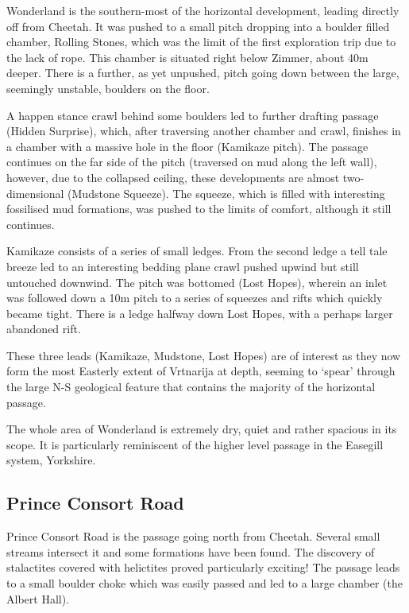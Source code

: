 Wonderland is the southern-most of the horizontal development, leading
directly off from Cheetah. It was pushed to a small pitch dropping into
a boulder filled chamber, Rolling Stones, which was the limit of the
first exploration trip due to the lack of rope. This chamber is situated
right below Zimmer, about 40m deeper. There is a further, as yet
unpushed, pitch going down between the large, seemingly unstable,
boulders on the floor.

A happen stance crawl behind some boulders led to further drafting
passage (Hidden Surprise), which, after traversing another chamber and
crawl, finishes in a chamber with a massive hole in the floor (Kamikaze
pitch). The passage continues on the far side of the pitch (traversed on
mud along the left wall), however, due to the collapsed ceiling, these
developments are almost two-dimensional (Mudstone Squeeze). The squeeze,
which is filled with interesting fossilised mud formations, was pushed
to the limits of comfort, although it still continues.

Kamikaze consists of a series of small ledges. From the second ledge a
tell tale breeze led to an interesting bedding plane crawl pushed upwind
but still untouched downwind. The pitch was bottomed (Lost Hopes),
wherein an inlet was followed down a 10m pitch to a series of squeezes
and rifts which quickly became tight. There is a ledge halfway down Lost
Hopes, with a perhaps larger abandoned rift.

These three leads (Kamikaze, Mudstone, Lost Hopes) are of interest as
they now form the most Easterly extent of Vrtnarija at depth, seeming to
`spear' through the large N-S geological feature that contains the
majority of the horizontal passage.

The whole area of Wonderland is extremely dry, quiet and rather spacious
in its scope. It is particularly reminiscent of the higher level passage
in the Easegill system, Yorkshire.

\subsection{Prince Consort Road}\label{prince-consort-road}

Prince Consort Road is the passage going north from Cheetah. Several
small streams intersect it and some formations have been found. The
discovery of stalactites covered with helictites proved particularly
exciting! The passage leads to a small boulder choke which was easily
passed and led to a large chamber (the Albert Hall).

